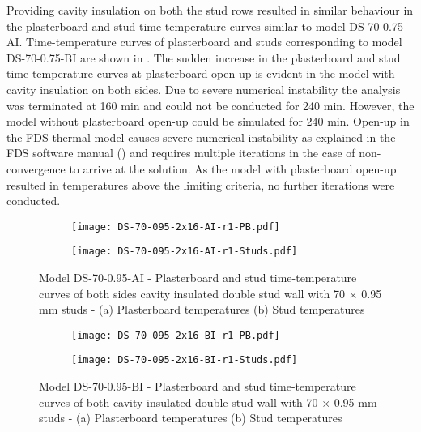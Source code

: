 Providing cavity insulation on both the stud rows resulted in similar behaviour in the plasterboard and stud time-temperature curves similar to model DS-70-0.75-AI. Time-temperature curves of plasterboard and studs corresponding to model DS-70-0.75-BI are shown in . The sudden increase in the plasterboard and stud time-temperature curves at plasterboard open-up is evident in the model with cavity insulation on both sides. Due to severe numerical instability the analysis was terminated at 160 min and could not be conducted for 240 min. However, the model without plasterboard open-up could be simulated for 240 min. Open-up in the FDS thermal model causes severe numerical instability as explained in the FDS software manual (\cite{fds2013}) and requires multiple iterations in the case of non-convergence to arrive at the solution. As the model with plasterboard open-up resulted in temperatures above the limiting criteria, no further iterations were conducted. 
\begin{figure}[!htbp]
	\centering
	\begin{subfigure}[b]{0.6\textwidth}
		\centering
		\texttt{[image: DS-70-095-2x16-AI-r1-PB.pdf]}
		\caption{}
		\label{subfig:DS-70-095-2x16-AI-r1-PB}
	\end{subfigure}
	\begin{subfigure}[b]{0.6\textwidth}
		\centering
		\texttt{[image: DS-70-095-2x16-AI-r1-Studs.pdf]}
		\caption{}
		\label{subfig:DS-70-095-2x16-AI-r1-Studs}
	\end{subfigure}
	   \caption{Model DS-70-0.95-AI - Plasterboard and stud time-temperature curves of both sides cavity insulated double stud wall with 70 $\times$ 0.95 mm studs - (a) Plasterboard temperatures (b) Stud temperatures}
	   \label{fig:DS-70-095-2x16-AI-r1}
\end{figure} 
\begin{figure}[!htbp]
	\centering
	\begin{subfigure}[b]{0.6\textwidth}
		\centering
		\texttt{[image: DS-70-095-2x16-BI-r1-PB.pdf]}
		\caption{}
		\label{subfig:DS-70-095-2x16-BI-r1-PB}
	\end{subfigure}
	\begin{subfigure}[b]{0.6\textwidth}
		\centering
		\texttt{[image: DS-70-095-2x16-BI-r1-Studs.pdf]}
		\caption{}
		\label{subfig:DS-70-095-2x16-BI-r1-Studs}
	\end{subfigure}
	   \caption{Model DS-70-0.95-BI - Plasterboard and stud time-temperature curves of both cavity insulated double stud wall with 70 $\times$ 0.95 mm studs - (a) Plasterboard temperatures (b) Stud temperatures}
	   \label{fig:DS-70-095-2x16-BI-r1}
\end{figure} 

